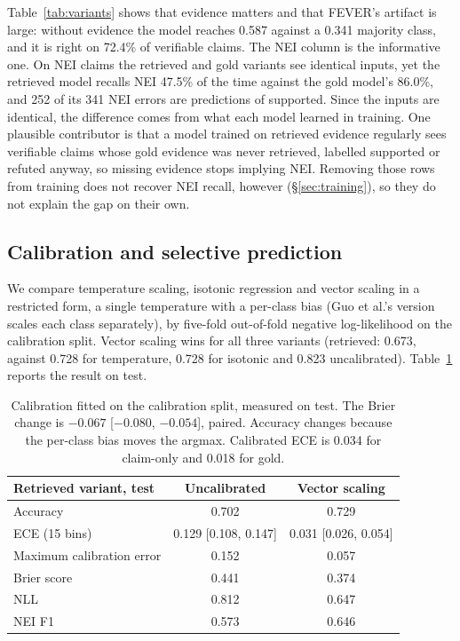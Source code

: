 \documentclass[11pt]{article}
\begin{document}
Table~\ref{tab:variants} shows that evidence matters and that FEVER's artifact is large: without evidence
the model reaches 0.587 against a 0.341 majority class, and it is right on 72.4\% of verifiable claims.
The NEI column is the informative one. On NEI claims the retrieved and gold variants see identical inputs,
yet the retrieved model recalls NEI 47.5\% of the time against the gold model's 86.0\%, and 252 of its 341
NEI errors are predictions of supported. Since the inputs are identical, the difference comes from what
each model learned in training. One plausible contributor is that a model trained on retrieved evidence
regularly sees verifiable claims whose gold evidence was never retrieved, labelled supported or refuted
anyway, so missing evidence stops implying NEI. Removing those rows from training does not recover NEI
recall, however (\S\ref{sec:training}), so they do not explain the gap on their own.

\subsection{Calibration and selective prediction}
\label{sec:calibration}

We compare temperature scaling, isotonic regression and vector scaling in a restricted form, a single
temperature with a per-class bias (Guo et al.'s version scales each class separately), by five-fold
out-of-fold negative log-likelihood on the calibration split. Vector scaling wins for all three variants
(retrieved: 0.673, against 0.728 for temperature, 0.728 for isotonic and 0.823 uncalibrated).
Table~\ref{tab:calibration} reports the result on test.

\begin{table}[t]
\centering
\small
\begin{tabular}{lcc}
\toprule
Retrieved variant, test & Uncalibrated & Vector scaling \\
\midrule
Accuracy & 0.702 & 0.729 \\
ECE (15 bins) & 0.129 [0.108, 0.147] & 0.031 [0.026, 0.054] \\
Maximum calibration error & 0.152 & 0.057 \\
Brier score & 0.441 & 0.374 \\
NLL & 0.812 & 0.647 \\
NEI F1 & 0.573 & 0.646 \\
\bottomrule
\end{tabular}
\caption{Calibration fitted on the calibration split, measured on test. The Brier change is $-0.067$
[$-0.080$, $-0.054$], paired. Accuracy changes because the per-class bias moves the argmax. Calibrated
ECE is 0.034 for claim-only and 0.018 for gold.}
\label{tab:calibration}
\end{table}
\end{document}
